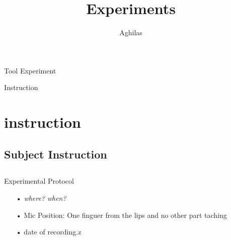 \documentclass[11pt]{beamer}
\author{Aghilas}
\title{Experiments}
\begin{document}
\begin{frame}
\titlepage
\end{frame}
\begin{frame}{Tool Experiment}
 
\end{frame}
\begin{frame}{Instruction}
\section{instruction}
\subsection{Subject Instruction}
\subsection{}

\end{frame}

\begin{frame}{Experimental Protocol }
\begin{itemize}
	\item[•]  \textit{where?} \textit {when?}
	\item[•] Mic Position: One finguer from the lips and no other part taching 
	\item[•] date of recording.z
\end{itemize}
\end{frame}
\end{document}
